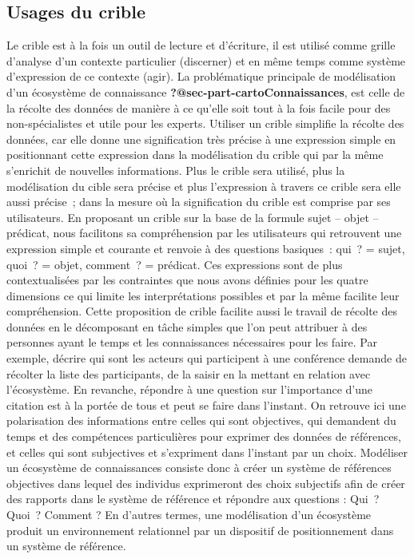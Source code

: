 \documentclass[
  a4paper,
  DIV=11,
  numbers=noendperiod]{scrreprt}
\begin{document}
\subsection{Usages du crible}\label{sec-usageCrible}

Le crible est à la fois un outil de lecture et d'écriture, il est
utilisé comme grille d'analyse d'un contexte particulier (discerner) et
en même temps comme système d'expression de ce contexte (agir). La
problématique principale de modélisation d'un écosystème de connaissance
\textbf{?@sec-part-cartoConnaissances}, est celle de la récolte des
données de manière à ce qu'elle soit tout à la fois facile pour des
non-spécialistes et utile pour les experts. Utiliser un crible simplifie
la récolte des données, car elle donne une signification très précise à
une expression simple en positionnant cette expression dans la
modélisation du crible qui par la même s'enrichit de nouvelles
informations. Plus le crible sera utilisé, plus la modélisation du cible
sera précise et plus l'expression à travers ce crible sera elle aussi
précise~; dans la mesure où la signification du crible est comprise par
ses utilisateurs. En proposant un crible sur la base de la formule sujet
-- objet -- prédicat, nous facilitons sa compréhension par les
utilisateurs qui retrouvent une expression simple et courante et renvoie
à des questions basiques~: qui~? = sujet, quoi~? = objet, comment~? =
prédicat. Ces expressions sont de plus contextualisées par les
contraintes que nous avons définies pour les quatre dimensions ce qui
limite les interprétations possibles et par la même facilite leur
compréhension. Cette proposition de crible facilite aussi le travail de
récolte des données en le décomposant en tâche simples que l'on peut
attribuer à des personnes ayant le temps et les connaissances
nécessaires pour les faire. Par exemple, décrire qui sont les acteurs
qui participent à une conférence demande de récolter la liste des
participants, de la saisir en la mettant en relation avec l'écosystème.
En revanche, répondre à une question sur l'importance d'une citation est
à la portée de tous et peut se faire dans l'instant. On retrouve ici une
polarisation des informations entre celles qui sont objectives, qui
demandent du temps et des compétences particulières pour exprimer des
données de références, et celles qui sont subjectives et s'expriment
dans l'instant par un choix. Modéliser un écosystème de connaissances
consiste donc à créer un système de références objectives dans lequel
des individus exprimeront des choix subjectifs afin de créer des
rapports dans le système de référence et répondre aux questions : Qui~?
Quoi~? Comment ? En d'autres termes, une modélisation d'un écosystème
produit un environnement relationnel par un dispositif de positionnement
dans un système de référence.
\end{document}
